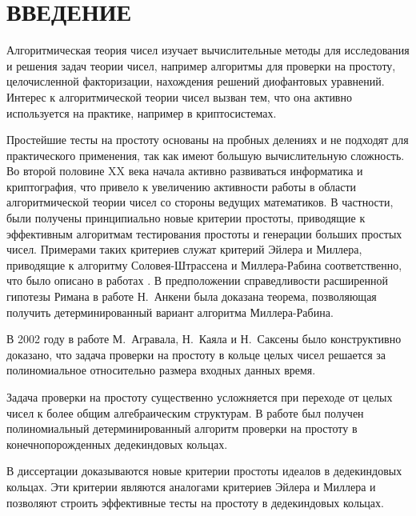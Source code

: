 \documentclass[_00_dissertation.tex]{subfiles}
\begin{document}
\onlyinsubfile{
    \renewcommand{\contentsname}{ОГЛАВЛЕНИЕ}
    \setcounter{tocdepth}{3}
    \tableofcontents
}

\chapter*{\MakeUppercase{Введение}}

Алгоритмическая теория чисел изучает вычислительные методы для исследования и решения задач теории чисел, например алгоритмы для проверки на простоту, целочисленной факторизации, нахождения решений диофантовых уравнений.
Интерес к алгоритмической теории чисел вызван тем, что она активно используется на практике, например в криптосистемах.

Простейшие тесты на простоту основаны на пробных делениях и не подходят для практического применения, так как имеют большую вычислительную сложность.
Во второй половине XX века начала активно развиваться информатика и криптография, что привело к увеличению активности работы в области алгоритмической теории чисел со стороны ведущих математиков.
В частности, были получены принципиально новые критерии простоты, приводящие к эффективным алгоритмам тестирования простоты и генерации больших простых чисел.
Примерами таких критериев служат критерий Эйлера и Миллера, приводящие к алгоритму Соловея-Штрассена и Миллера-Рабина соответственно, что было описано в работах \cite{source:Miller, source:Rabin, source:Solovay}.
В предположении справедливости расширенной гипотезы Римана в работе Н.~Анкени \cite{source:Ankeny} была доказана теорема, позволяющая получить детерминированный вариант алгоритма Миллера-Рабина.

В 2002 году в работе М.~Агравала, Н.~Каяла и Н.~Саксены \cite{source:AKS} было конструктивно доказано, что задача проверки на простоту в кольце целых чисел решается за полиномиальное относительно размера входных данных время.

Задача проверки на простоту существенно усложняется при переходе от целых чисел к более общим алгебраическим структурам.
В работе \cite{source:Huang_Prime_in_P} был получен полиномиальный детерминированный алгоритм проверки на простоту в конечнопорожденных дедекиндовых кольцах.

В диссертации доказываются новые критерии простоты идеалов в дедекиндовых кольцах.
Эти критерии являются аналогами критериев Эйлера и Миллера и позволяют строить эффективные тесты на простоту в дедекиндовых кольцах.
\end{document}
